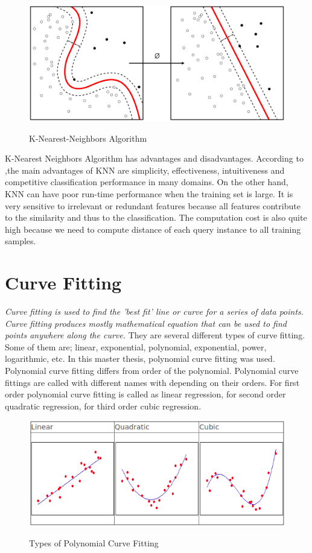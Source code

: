\begin{figure}[H]
 \centering
  \includegraphics[width=1\textwidth]{./Bilder/k-nearest-neighbors.png}\label{Procedures_of_IPM}
  \caption{K-Nearest-Neighbors Algorithm\cite{k_nearest_neighbors_wikipedia}}
\end{figure}

K-Nearest Neighbors Algorithm has advantages and disadvantages. According to \cite{k_nearest_neighbors_adv_disadv},the main advantages of KNN are simplicity, effectiveness, intuitiveness and competitive classification performance in many domains. On the other hand, KNN can have poor run-time performance when the training set is large. It is very sensitive to irrelevant or redundant features because all features contribute to the similarity and thus to the
classification. The computation cost is also quite high because we need to compute distance of each query instance to all training samples. 

%
\section{Curve Fitting}\label{sec:Curve Fitting}

\emph{\color{red}Curve fitting is used to find the 'best fit' line or curve for a series of data points. Curve fitting produces mostly mathematical equation that can be used to find points anywhere along
the curve.\cite{Curve_Fitting}} They are several different types of curve fitting. Some of them are; linear, exponential, polynomial, exponential, power, logarithmic, etc. In this master thesis, polynomial curve fitting was used. Polynomial curve fitting differs from order of the polynomial. Polynomial curve fittings are called with different names with depending on their orders. For first order polynomial curve fitting is called as linear regression, for second order quadratic regression, for third order cubic regression.

\begin{figure}[H]
 \centering
  \includegraphics[width=1\textwidth]{./Bilder/Curve_Fitting_Polynomial.png}\label{Curve_Fitting_Polynomial}
  \caption{Types of Polynomial Curve Fitting\cite{Curve_Fitting_Polynomial}}
\end{figure}

%




